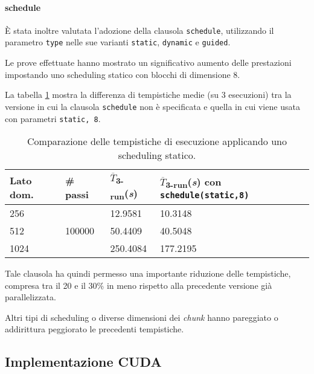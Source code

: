 \paragraph{schedule}

È stata inoltre valutata l'adozione della clausola \texttt{schedule},
utilizzando il parametro \texttt{type} nelle sue varianti \texttt{static},
\texttt{dynamic} e \texttt{guided}.

Le prove effettuate hanno mostrato un significativo aumento delle prestazioni
impostando uno scheduling statico con blocchi di dimensione 8.

La tabella \ref{tab:schedule} mostra la differenza di tempistiche medie (su 3
esecuzioni) tra la versione in cui la clausola \texttt{schedule} non è
specificata e quella in cui viene usata con parametri \texttt{static, 8}.

\begin{table}[ht]
\centering
\begin{tabularx}{400pt}{XXXX}
\toprule
Lato dom. & \# passi & $\overline{T}$\textsubscript{3-run}(\textit{s})&
$\overline{T}$\textsubscript{3-run}(\textit{s}) con \texttt{schedule(static,8)}\\
\midrule
 256 & \multirow{3}{*}{100000} & 12.9581 & 10.3148 \\
 512 && 50.4409 & 40.5048 \\
 1024 && 250.4084 & 177.2195 \\
\bottomrule
\end{tabularx}
\caption{\label{tab:schedule}Comparazione delle tempistiche di esecuzione
applicando uno scheduling statico.}
\end{table}

Tale clausola ha quindi permesso una importante riduzione delle tempistiche,
compresa tra il 20 e il 30\% in meno rispetto alla precedente versione già
parallelizzata.

Altri tipi di scheduling o diverse dimensioni dei \textit{chunk} hanno
pareggiato o addirittura peggiorato le precedenti tempistiche.


\subsection{Implementazione CUDA}

